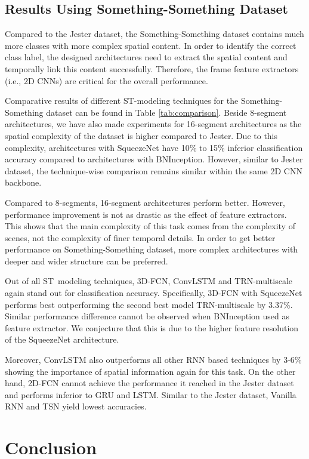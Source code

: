 \documentclass[runningheads]{llncs}
\begin{document}
\subsection{Results Using Something-Something Dataset}

Compared to the Jester dataset, the Something-Something dataset contains much more classes with more complex spatial content. In order to identify the correct class label, the designed architectures need to extract the spatial content and temporally link this content successfully. Therefore, the frame feature extractors (i.e., 2D CNNs) are critical for the overall performance.

Comparative results of different ST-modeling techniques for the Something-Something dataset can be found in Table \ref{tab:comparison}. Beside 8-segment architectures, we have also made experiments for 16-segment architectures as the spatial complexity of the dataset is higher compared to Jester. Due to this complexity, architectures with SqueezeNet have 10\% to 15\% inferior classification accuracy compared to architectures with BNInception. However, similar to Jester dataset, the technique-wise comparison remains similar within the same 2D CNN backbone.

Compared to 8-segments, 16-segment architectures perform better. However, performance improvement is not as drastic as the effect of feature extractors. This shows that the main complexity of this task comes from the complexity of scenes, not the complexity of finer temporal details. In order to get better performance on Something-Something dataset, more complex architectures with deeper and wider structure can be preferred. 

Out of all ST~modeling techniques, 3D-FCN, ConvLSTM and TRN-multiscale again stand out for classification accuracy. Specifically, 3D-FCN with SqueezeNet performs best outperforming the second best model TRN-multiscale by 3.37\%. Similar performance difference cannot be observed when BNInception used as feature extractor. We conjecture that this is due to the higher feature resolution of the SqueezeNet architecture.

Moreover, ConvLSTM also outperforms all other RNN based techniques by 3-6\% showing the importance of spatial information again for this task. On the other hand, 2D-FCN cannot achieve the performance it reached in the Jester dataset and performs inferior to GRU and LSTM. Similar to the Jester dataset, Vanilla RNN and TSN yield lowest accuracies.  \section{Conclusion}
\end{document}

